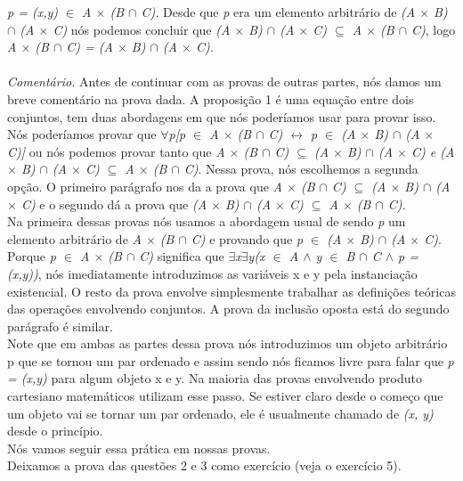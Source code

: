   \textit{p = (x,y) $\in$ A $\times$ (B $\cap$ C).} Desde que \textit{p} era um elemento arbitrário de \textit{(A $\times$ B)
  $\cap$ (A $\times$ C)} nós podemos concluir que \textit{(A $\times$ B) $\cap$ (A $\times$ C) $\subseteq$ A $\times$ (B $\cap$
  C)}, logo \textit{A $\times$ (B $\cap$ C) = (A $\times$ B) $\cap$ (A $\times$ C).}
\\
\\
\textit{Comentário.} Antes de continuar com as provas de outras partes, nós damos um breve comentário na prova dada. A proposição
1 é uma equação entre dois conjuntos, tem duas abordagens em que nós poderíamos usar para provar isso. Nós poderíamos provar que
$\forall$\textit{p[p $\in$ A $\times$ (B $\cap$ C) $\leftrightarrow$ p $\in$ (A $\times$ B) $\cap$ (A $\times$ C)]} ou nós podemos 
provar tanto que \textit{A $\times$ (B $\cap$ C) $\subseteq$ (A $\times$ B) $\cap$ (A $\times$ C) e (A $\times$ B) $\cap$
(A $\times$ C) $\subseteq$ A $\times$ (B $\cap$ C)}. Nessa prova, nós escolhemos a segunda opção. O primeiro parágrafo nos da 
a prova que \textit{A $\times$ (B $\cap$ C) $\subseteq$ (A $\times$ B) $\cap$ (A $\times$ C)} e o segundo dá a prova que 
\textit{(A $\times$ B) $\cap$ (A $\times$ C) $\subseteq$ A $\times$ (B $\cap$ C).}
\\
\indent Na primeira dessas provas nós usamos a abordagem usual de sendo \textit{p} um elemento arbitrário de \textit{A $\times$ (B $\cap$ C)}
  e provando que \textit{p $\in$ (A $\times$ B) $\cap$ (A $\times$ C)}. Porque \textit{p $\in$ A $\times$ (B $\cap$ C)}
   significa que \textit{$\exists$x$\exists$y(x $\in$ A $\wedge$ y $\in$ B $\cap$ C $\wedge$ p = (x,y))}, nós imediatamente 
   introduzimos as variáveis x e y pela instanciação existencial. O resto da prova envolve simplesmente trabalhar as definições
   teóricas das operações envolvendo conjuntos. A prova da inclusão oposta está do segundo parágrafo é similar.
\\
  \indent Note que em ambas as partes dessa prova nós introduzimos um objeto arbitrário p que se tornou um par ordenado e assim sendo
  nós ficamos livre para falar que \textit{p = (x,y)} para algum objeto x e y. Na maioria das provas envolvendo produto cartesiano
  matemáticos utilizam esse passo. Se estiver claro desde o começo que um objeto vai se tornar um par ordenado, ele é usualmente
  chamado de \textit{(x, y)} desde o princípio.
\\ Nós vamos seguir essa prática em nossas provas.
\\ \indent Deixamos a prova das questões 2 e 3 como exercício (veja o exercício 5).
